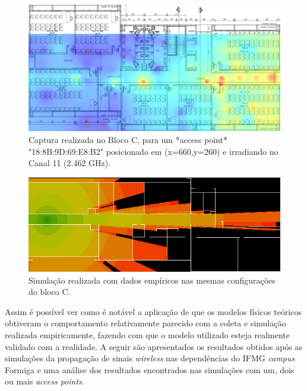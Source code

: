 \documentclass[
	12pt,				%
	twoside,			%
	a4paper,			%
	english,			%
	french,				%
	spanish,			%
	brazil				%
	]{abntex2}
\begin{document}
\begin{figure}[ht]
    \caption{\label{captura} Captura realizada no Bloco C, para um *access point* "18:8B:9D:69:E8:B2" posicionado em (x=660,y=260) e irradiando no Canal 11 (2.462 GHz).}
    \begin{center}
        \includegraphics[scale=0.5]{imagens/captura.jpg}
    \end{center}
\end{figure}
\begin{figure}[ht]
    \caption{\label{simulacao_vinicius} Simulação realizada com dados empíricos nas mesmas configurações do bloco C.}
    \begin{center}
        \includegraphics[scale=0.7]{imagens/simulacao_vinicius.png}
    \end{center}
\end{figure}

Assim é possível ver como é notável a aplicação de que os modelos
físicos teóricos obtiveram o comportamento relativamente parecido com a
coleta e simulação realizada empiricamente, fazendo com que o modelo
utilizado esteja realmente validado com a realidade. A seguir são
apresentados os resultados obtidos após as simulações da propagação de
sinais \emph{wireless} nas dependências do IFMG \emph{campus} Formiga e
uma análise dos resultados encontrados nas simulações com um, dois ou
mais \emph{access points}.
\end{document}
